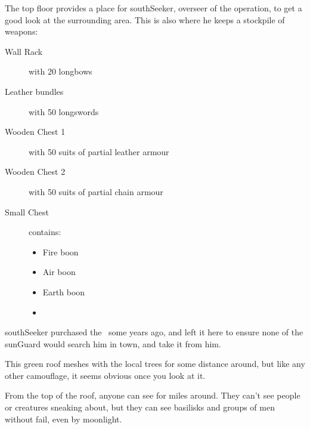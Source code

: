 The top floor provides a place for \gls{southSeeker}, overseer of the operation, to get a good look at the surrounding area.
This is also where he keeps a stockpile of weapons:

\begin{description}
  \item[Wall Rack]
  with
  20 longbows
  \item[Leather bundles]
  with
  50 longswords
  \item[Wooden Chest 1]
  with
  50 suits of partial leather armour
  \item[Wooden Chest 2]
  with
  50 suits of partial chain armour
  \item[Small Chest]
  contains:
  \begin{itemize}
    \item
    Fire \gls{boon}
    \item
    Air \gls{boon}
    \item
    Earth \gls{boon}
    \item
    \lootMagic
  \end{itemize}
\end{description}

\addtocounter{treasure}{-1}
\Gls{southSeeker} purchased the \lootMagic\ some years ago, and left it here to ensure none of the \gls{sunGuard} would search him in \gls{town}, and take it from him.

\showTalisman


This green roof meshes with the local trees for some distance around, but like any other camouflage, it seems obvious once you look at it.

From the top of the roof, anyone can see for miles around.
They can't see people or creatures sneaking about, but they can see basilisks and groups of men without fail, even by moonlight.


